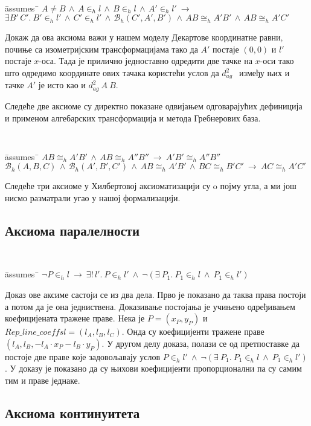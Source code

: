\documentclass[a4paper, 12pt]{article}
\newcommand{\agsqdist}[2]{\ensuremath{d^2_{ag}\ #1\ #2}}
\newcommand{\inh}[2]{\ensuremath{#1 \in_h #2}}
\renewcommand{\beth}[3]{\ensuremath{\mathcal{B}_h(#1, #2, #3)}}
\newcommand{\congrh}[4]{\ensuremath{#1#2 \cong_h #3#4}}
\begin{document}
{\tt
\begin{tabbing}
\hspace{5mm}\=assumes\ \=\kill
$A \neq B\,\wedge\,\inh{A}{l}\,\wedge\,\inh{B}{l}\,\wedge\,\inh{A'}{l'}\ \longrightarrow$\\
\> $\exists B'\, C'.\ \inh{B'}{l'}\,\wedge\,\inh{C'}{l'}\,\wedge\,\beth{C'}{A'}{B'}\,\wedge\,\congrh{A}{B}{A'}{B'}\,\wedge\,\congrh{A}{B}{A'}{C'}$
\end{tabbing}
}

Докаж да ова аксиома важи у нашем моделу Декартове координатне равни,
почиње са изометријским трансформацијама тако да $A'$ постаје $(0, 0)$
и $l'$ постаје $x$-оса. Тада је прилично једноставно одредити две
тачке на $x$-оси тако што одредимо координате ових тачака користећи
услов да $\agsqdist{}{}$ између њих и тачке $A'$ је исто као и
$\agsqdist{A}{B}$.

Следеће две аксиоме су директно показане одвијањем одговарајућих
дефиниција и применом алгебарских трансформација и метода Гребнерових
база.

{\tt
\begin{tabbing}
\hspace{5mm}\=assumes\ \=\kill
$\congrh{A}{B}{A'}{B'}\,\wedge\,\congrh{A}{B}{A''}{B''}\ \longrightarrow\ \congrh{A'}{B'}{A''}{B''}$\\
$\beth{A}{B}{C}\,\wedge\,\beth{A'}{B'}{C'}\,\wedge\,\congrh{A}{B}{A'}{B'}\,\wedge\,\congrh{B}{C}{B'}{C'} \ \longrightarrow\ \congrh{A}{C}{A'}{C'}$
\end{tabbing}
}

Следеће три аксиоме у Хилбертовој аксиоматизацији су o појму угла, а
ми још нисмо разматрали угао у нашој формализацији.

\subsection{Аксиома паралелности}

{\tt
\begin{tabbing}
\hspace{5mm}\=assumes\ \=\kill
$\neg \inh{P}{l} \ \longrightarrow\ \exists!\,l'.\ \inh{P}{l'}\ \wedge\ \neg (\exists\ P_1.\ \inh{P_1}{l}\ \wedge\  \inh{P_1}{l'})$
\end{tabbing}
}

Доказ ове аксиме састоји се из два дела. Прво је показано да таква
права постоји а потом да је она једниствена. Доказивање постојања је
учињено одређивањем коефицијената тражене праве. Нека је $P = (x_P,
y_P)$ и $\mathit{Rep\_line\_coeffs} l = (l_A, l_B, l_C)$. Онда су
коефицијенти тражене праве $(l_A, l_B, -l_A\cdot x_P - l_B\cdot
y_P)$. У другом делу доказа, полази се од претпоставке да постоје две
праве које задовољавају услов $\inh{P}{l'}\ \wedge\ \neg
(\exists\ P_1.\ \inh{P_1}{l}\ \wedge\ \inh{P_1}{l'})$. У доказу је
показано да су њихови коефицијенти пропорционални па су самим тим и
праве једнаке.

\subsection{Аксиома континуитета}
\end{document}

